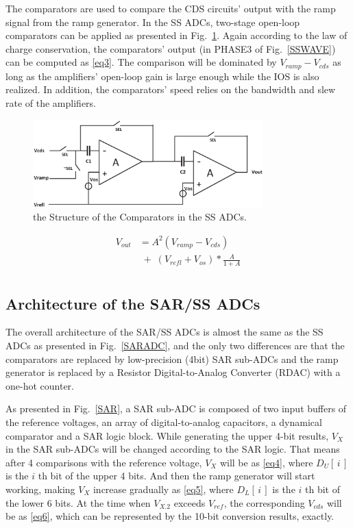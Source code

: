 The comparators are used to compare the CDS circuits' output with the ramp signal from the ramp generator. 
In the SS ADCs, two-stage open-loop comparators can be applied as presented in Fig.~\ref{COM}. Again according to the law of charge conservation, 
the comparators’ output (in PHASE3 of Fig.~\ref{SSWAVE}) can be computed as \eqref{eq3}. The comparison will be dominated by $V_{ramp}-V_{cds}$ as long as the amplifiers’ open-loop gain 
is large enough while the IOS is also realized. In addition, the comparators’ speed relies on the bandwidth and slew rate of the amplifiers.

\begin{figure}[htbp]
	\centerline{\includegraphics[width=3.5in]{./Figures/COM.eps}}
	\caption{the Structure of the Comparators in the SS ADCs.}
	\label{COM}
\end{figure} 

\begin{equation}
	\begin{aligned}
		V_{out}&=A^2(V_{ramp}-V_{cds})\\
		&\;{+}\;\left(V_{refl}+V_{os}\right)\ast\frac{A}{1+A}\\ 		
		\label{eq3}
	\end{aligned}
\end{equation}

\subsection{Architecture of the SAR/SS ADCs}

The overall architecture of the SAR/SS ADCs is almost the same as the SS ADCs as presented in Fig.~\ref{SARADC}, and the only two differences are that the comparators are replaced by low-precision (4bit) SAR sub-ADCs and
the ramp generator is replaced by a Resistor Digital-to-Analog Converter (RDAC) with a one-hot counter.

As presented in Fig.~\ref{SAR}, a SAR sub-ADC is composed of two input buffers of the reference voltages, an array of digital-to-analog capacitors, a dynamical comparator and a SAR logic block. While generating the upper 4-bit results, $V_{X}$ in the SAR sub-ADCs will be changed according to the SAR logic. That means after 4 comparisons 
with the reference voltage, $V_{X}$ will be as \eqref{eq4}, where $D_{U}\left[\,i\,\right]$ is the $i$ th bit of the upper 4 bits. 
And then the ramp generator will start working, making $V_{X}$ increase gradually as \eqref{eq5}, where $D_{L}\left[\,i\,\right]$ is the $i$ th bit of the lower 6 bits. 
At the time when $V_{X.2}$ exceeds $V_{ref}$, the corresponding $V_{cds}$ will be as \eqref{eq6}, which can be represented by the 10-bit conversion results, exactly.

